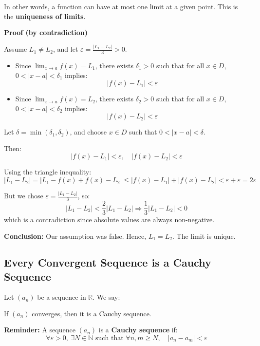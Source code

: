 In other words, a function can have at most one limit at a given point. This is the \textbf{uniqueness of limits}.

\textbf{Proof (by contradiction)}

Assume \( L_1 \ne L_2 \), and let \( \varepsilon = \frac{|L_1 - L_2|}{3} > 0 \).

\begin{itemize}[label=\(-\)]
    \item Since \( \lim_{x \to a} f(x) = L_1 \), there exists \( \delta_1 > 0 \) such that for all \( x \in D \), \( 0 < |x - a| < \delta_1 \) implies:
    \[
    |f(x) - L_1| < \varepsilon
    \]
    
    \item Since \( \lim_{x \to a} f(x) = L_2 \), there exists \( \delta_2 > 0 \) such that for all \( x \in D \), \( 0 < |x - a| < \delta_2 \) implies:
    \[
    |f(x) - L_2| < \varepsilon
    \]
\end{itemize}

Let \( \delta = \min(\delta_1, \delta_2) \), and choose \( x \in D \) such that \( 0 < |x - a| < \delta \).

Then:
\[
|f(x) - L_1| < \varepsilon, \quad |f(x) - L_2| < \varepsilon
\]

Using the triangle inequality:
\[
|L_1 - L_2| = |L_1 - f(x) + f(x) - L_2| \le |f(x) - L_1| + |f(x) - L_2| < \varepsilon + \varepsilon = 2\varepsilon
\]

But we chose \( \varepsilon = \frac{|L_1 - L_2|}{3} \), so:
\[
|L_1 - L_2| < \frac{2}{3}|L_1 - L_2| \Rightarrow \frac{1}{3}|L_1 - L_2| < 0
\]
which is a contradiction since absolute values are always non-negative.

\textbf{Conclusion:} Our assumption was false. Hence, \( L_1 = L_2 \). The limit is unique.

\QED

\subsection{Every Convergent Sequence is a Cauchy Sequence}

Let \( (a_n) \) be a sequence in \( \mathbb{R} \). We say:

If \( (a_n) \) converges, then it is a Cauchy sequence.

\textbf{Reminder:}  
A sequence \( (a_n) \) is a \textbf{Cauchy sequence} if:
\[
\forall \varepsilon > 0, \ \exists N \in \mathbb{N} \text{ such that } \forall n, m \ge N, \quad |a_n - a_m| < \varepsilon
\]

